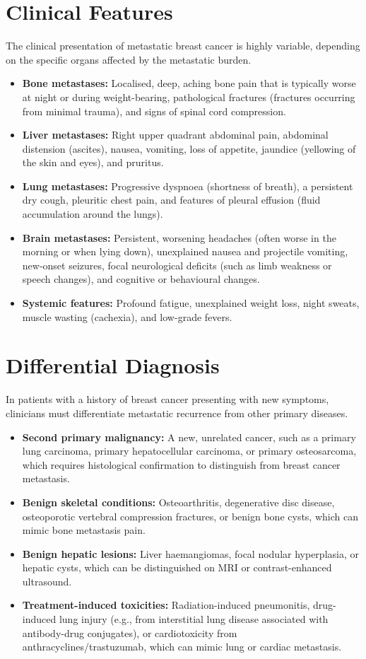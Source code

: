 \section*{Clinical Features}
The clinical presentation of metastatic breast cancer is highly variable, depending on the specific organs affected by the metastatic burden.
\begin{itemize}
    \item \textbf{Bone metastases:} Localised, deep, aching bone pain that is typically worse at night or during weight-bearing, pathological fractures (fractures occurring from minimal trauma), and signs of spinal cord compression.
    \item \textbf{Liver metastases:} Right upper quadrant abdominal pain, abdominal distension (ascites), nausea, vomiting, loss of appetite, jaundice (yellowing of the skin and eyes), and pruritus.
    \item \textbf{Lung metastases:} Progressive dyspnoea (shortness of breath), a persistent dry cough, pleuritic chest pain, and features of pleural effusion (fluid accumulation around the lungs).
    \item \textbf{Brain metastases:} Persistent, worsening headaches (often worse in the morning or when lying down), unexplained nausea and projectile vomiting, new-onset seizures, focal neurological deficits (such as limb weakness or speech changes), and cognitive or behavioural changes.
    \item \textbf{Systemic features:} Profound fatigue, unexplained weight loss, night sweats, muscle wasting (cachexia), and low-grade fevers.
\end{itemize}

\section*{Differential Diagnosis}
In patients with a history of breast cancer presenting with new symptoms, clinicians must differentiate metastatic recurrence from other primary diseases.
\begin{itemize}
    \item \textbf{Second primary malignancy:} A new, unrelated cancer, such as a primary lung carcinoma, primary hepatocellular carcinoma, or primary osteosarcoma, which requires histological confirmation to distinguish from breast cancer metastasis.
    \item \textbf{Benign skeletal conditions:} Osteoarthritis, degenerative disc disease, osteoporotic vertebral compression fractures, or benign bone cysts, which can mimic bone metastasis pain.
    \item \textbf{Benign hepatic lesions:} Liver haemangiomas, focal nodular hyperplasia, or hepatic cysts, which can be distinguished on MRI or contrast-enhanced ultrasound.
    \item \textbf{Treatment-induced toxicities:} Radiation-induced pneumonitis, drug-induced lung injury (e.g., from interstitial lung disease associated with antibody-drug conjugates), or cardiotoxicity from anthracyclines/trastuzumab, which can mimic lung or cardiac metastasis.
\end{itemize}

